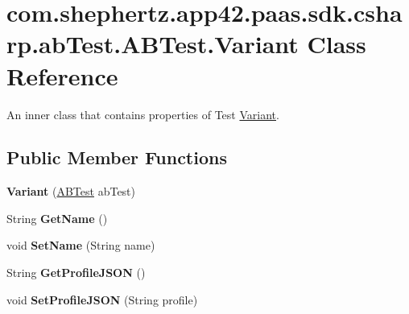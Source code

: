 \hypertarget{classcom_1_1shephertz_1_1app42_1_1paas_1_1sdk_1_1csharp_1_1ab_test_1_1_a_b_test_1_1_variant}{\section{com.\+shephertz.\+app42.\+paas.\+sdk.\+csharp.\+ab\+Test.\+A\+B\+Test.\+Variant Class Reference}
\label{classcom_1_1shephertz_1_1app42_1_1paas_1_1sdk_1_1csharp_1_1ab_test_1_1_a_b_test_1_1_variant}
}


An inner class that contains properties of Test \hyperlink{classcom_1_1shephertz_1_1app42_1_1paas_1_1sdk_1_1csharp_1_1ab_test_1_1_a_b_test_1_1_variant}{Variant}.  


\subsection*{Public Member Functions}
\begin{DoxyCompactItemize}
\item 
\hypertarget{classcom_1_1shephertz_1_1app42_1_1paas_1_1sdk_1_1csharp_1_1ab_test_1_1_a_b_test_1_1_variant_a882956ecf5d9acbef883f50d3181eb1b}{{\bfseries Variant} (\hyperlink{classcom_1_1shephertz_1_1app42_1_1paas_1_1sdk_1_1csharp_1_1ab_test_1_1_a_b_test}{A\+B\+Test} ab\+Test)}\label{classcom_1_1shephertz_1_1app42_1_1paas_1_1sdk_1_1csharp_1_1ab_test_1_1_a_b_test_1_1_variant_a882956ecf5d9acbef883f50d3181eb1b}

\item 
\hypertarget{classcom_1_1shephertz_1_1app42_1_1paas_1_1sdk_1_1csharp_1_1ab_test_1_1_a_b_test_1_1_variant_a67ac2afebc780b265b37f67157a2df8f}{String {\bfseries Get\+Name} ()}\label{classcom_1_1shephertz_1_1app42_1_1paas_1_1sdk_1_1csharp_1_1ab_test_1_1_a_b_test_1_1_variant_a67ac2afebc780b265b37f67157a2df8f}

\item 
\hypertarget{classcom_1_1shephertz_1_1app42_1_1paas_1_1sdk_1_1csharp_1_1ab_test_1_1_a_b_test_1_1_variant_a4c8ea21fb9fc701cd79aeeb5b73df6e4}{void {\bfseries Set\+Name} (String name)}\label{classcom_1_1shephertz_1_1app42_1_1paas_1_1sdk_1_1csharp_1_1ab_test_1_1_a_b_test_1_1_variant_a4c8ea21fb9fc701cd79aeeb5b73df6e4}

\item 
\hypertarget{classcom_1_1shephertz_1_1app42_1_1paas_1_1sdk_1_1csharp_1_1ab_test_1_1_a_b_test_1_1_variant_a80f09f44ec4eafa90efc20f7990f3ffc}{String {\bfseries Get\+Profile\+J\+S\+O\+N} ()}\label{classcom_1_1shephertz_1_1app42_1_1paas_1_1sdk_1_1csharp_1_1ab_test_1_1_a_b_test_1_1_variant_a80f09f44ec4eafa90efc20f7990f3ffc}

\item 
\hypertarget{classcom_1_1shephertz_1_1app42_1_1paas_1_1sdk_1_1csharp_1_1ab_test_1_1_a_b_test_1_1_variant_a2f4828d1e5699dec94b90f69c27dc350}{void {\bfseries Set\+Profile\+J\+S\+O\+N} (String profile)}\label{classcom_1_1shephertz_1_1app42_1_1paas_1_1sdk_1_1csharp_1_1ab_test_1_1_a_b_test_1_1_variant_a2f4828d1e5699dec94b90f69c27dc350}

\end{DoxyCompactItemize}
